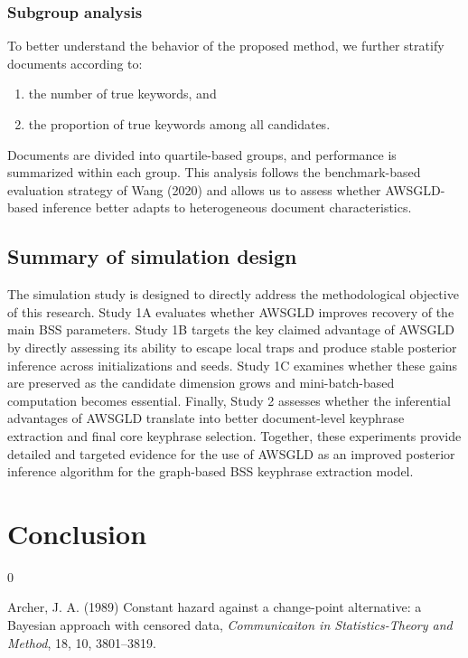 \documentclass[11pt]{article}
\begin{document}
\subsubsection{Subgroup analysis}

To better understand the behavior of the proposed method, we further stratify documents according to:
\begin{enumerate}
    \item the number of true keywords, and
    \item the proportion of true keywords among all candidates.
\end{enumerate}
Documents are divided into quartile-based groups, and performance is summarized within each group. This analysis follows the benchmark-based evaluation strategy of Wang (2020) and allows us to assess whether AWSGLD-based inference better adapts to heterogeneous document characteristics.

\subsection{Summary of simulation design}
\label{subsec:sim_summary}

The simulation study is designed to directly address the methodological objective of this research. Study 1A evaluates whether AWSGLD improves recovery of the main BSS parameters. Study 1B targets the key claimed advantage of AWSGLD by directly assessing its ability to escape local traps and produce stable posterior inference across initializations and seeds. Study 1C examines whether these gains are preserved as the candidate dimension grows and mini-batch-based computation becomes essential. Finally, Study 2 assesses whether the inferential advantages of AWSGLD translate into better document-level keyphrase extraction and final core keyphrase selection. Together, these experiments provide detailed and targeted evidence for the use of AWSGLD as an improved posterior inference algorithm for the graph-based BSS keyphrase extraction model.

\section{Conclusion}
\par

\bigskip
\begin{thebibliography}{0}
\item[] Archer, J. A. (1989) Constant hazard against a change-point alternative: a Bayesian approach with censored data, {\it Communicaiton in Statistics-Theory and Method}, 18, 10, 3801--3819.
\end{thebibliography}
\end{document}
